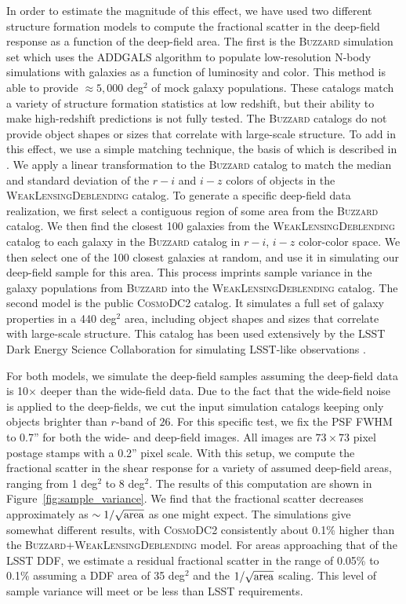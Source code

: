 \documentclass[twocolumn]{openjournal}
\makeatletter
\newcommand{\descwl}{\textsc{WeakLensingDeblending}\@\xspace}
\newcommand{\cosmodctwo}{\textsc{CosmoDC2}\@\xspace}
\newcommand{\buzzard}{\textsc{Buzzard}\@\xspace}
\makeatother
\begin{document}
In order to estimate the magnitude of this effect, we have used two different structure
formation models to compute the fractional scatter in the deep-field response as a
function of the deep-field area. The first is the \buzzard simulation set
\citep{derose2019buzzard,derose2021Buzzard} which uses the \textsc{ADDGALS} \citep{addgals} algorithm to
populate low-resolution N-body simulations with galaxies as a function of luminosity
and color. This method is able to provide $\approx5,000$ deg$^2$ of mock galaxy
populations. These catalogs match a variety of structure formation statistics at low
redshift, but their ability to make high-redshift predictions is not fully tested. The
\buzzard catalogs do not provide object shapes or sizes that correlate with large-scale
structure. To add in this effect, we use a simple matching technique, the basis of which
is described in \citet{galsampler}. We apply a linear transformation to the \buzzard
catalog to match the median and standard deviation of the $r-i$ and $i-z$ colors  of
objects in the \descwl catalog. To generate a specific deep-field data realization, we
first select a contiguous region of some area from the \buzzard catalog. We then find
the closest 100 galaxies from the \descwl catalog to each galaxy in the \buzzard catalog
in $r-i$, $i-z$ color-color space. We then select one of the 100 closest galaxies at
random, and use it in simulating our deep-field sample for this area. This process
imprints sample variance in the galaxy populations from \buzzard into the \descwl
catalog. The second model is the public \cosmodctwo \citep{cosmodc2} catalog. It
simulates a full set of galaxy properties in a 440 deg$^2$ area, including object shapes
and sizes that correlate with large-scale structure. This catalog has been used
extensively by the LSST Dark Energy Science Collaboration for simulating LSST-like
observations \citep{dc2,dc2note}.

For both models, we simulate the deep-field samples assuming the deep-field data is
10$\times$ deeper than the wide-field data. Due to the fact that the wide-field noise is
applied to the deep-fields, we cut the input simulation catalogs keeping only objects
brighter than $r$-band of $26$. For this specific test, we fix the PSF FWHM to 0.7'' for
both the wide- and deep-field images. All images are $73\times73$ pixel postage stamps
with a 0.2'' pixel scale. With this setup, we compute the fractional scatter
in the shear response for a variety of assumed deep-field areas, ranging from 1 deg$^2$
to 8 deg$^2$. The results of this computation are shown in
Figure~\ref{fig:sample_variance}. We find that the fractional scatter decreases
approximately as $\sim1/\sqrt{\rm area}$ as one might expect. The simulations give
somewhat different results, with \cosmodctwo consistently about 0.1\% higher than the
\buzzard+\descwl model. For areas approaching that of the LSST DDF, we estimate a
residual fractional scatter in the range of 0.05\% to 0.1\% assuming a DDF area of 35
deg$^2$ and the $1/\sqrt{\rm area}$ scaling. This level of sample variance will meet or
be less than LSST requirements.
\end{document}
